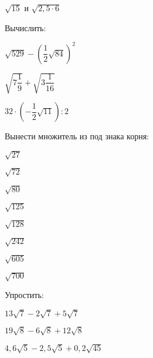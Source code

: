\begin{homework}[number=1]
\begin{listofex}
\begin{enumcols}[itemcolumns=2]
			\item \( \sqrt{15} \) и \( \sqrt{2,5\cdot6} \)
		\end{enumcols}
		\item Вычислить:
	\begin{enumcols}[itemcolumns=2]
		\item \( \sqrt{529}-\left( \dfrac{1}{2}\sqrt{84} \right)^2 \)
		\item \( \sqrt{7\dfrac{1}{9}}+\sqrt{3\dfrac{1}{16}} \)
		\item \( 32\cdot\left( -\dfrac{1}{2}\sqrt{11} \right):2 \)
	\end{enumcols}	
		\item Вынести множитель из под знака корня:
		\begin{enumcols}[itemcolumns=8]
			\item \( \sqrt{27} \)
			\item \( \sqrt{72} \)
			\item \( \sqrt{80} \)
			\item \( \sqrt{125} \)
			\item \( \sqrt{128} \)
			\item \( \sqrt{242} \)
			\item \( \sqrt{605} \)
			\item \( \sqrt{700} \)
		\end{enumcols} 	
		\item Упростить:
	\begin{enumcols}[itemcolumns=2]
		\item \( 13\sqrt{7}-2\sqrt{7}+5\sqrt{7} \)
		\item \( 19\sqrt{8}-6\sqrt{8}+12\sqrt{8} \)
		\item \( 4,6\sqrt{5}-2,5\sqrt{5}+0,2\sqrt{45} \)
		\item {}
	\end{enumcols}
	\end{listofex}
\end{homework}
%
